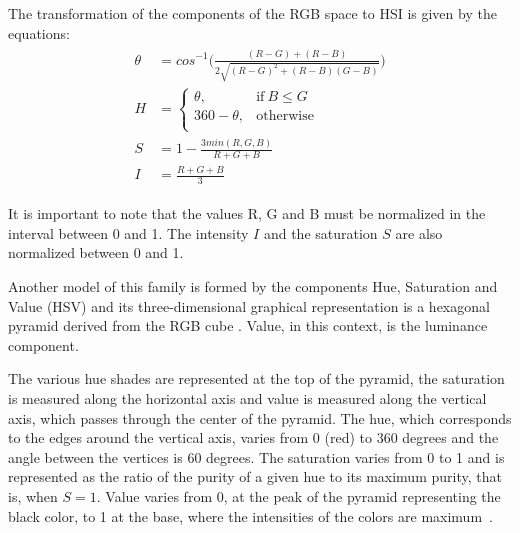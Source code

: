 The transformation of the components of the RGB space to HSI is given by the equations:
\begin{align}
\label{eq:rgb_para_hsi}
\begin{split}
  \theta &= cos^{-1} \bigg( \frac{(R - G) + (R - B)}{2 \sqrt{(R - G)^2 + (R - B)(G - B)}} \bigg)
  \\[0.5em]
  H &= \begin{cases}
            \theta,       & \text{if}\ B \leq G\\
            360 - \theta, & \text{otherwise}\\
       \end{cases}
  \\[0.5em]
  S &= 1 - \frac{3 min(R, G, B)}{R + G + B}
  \\[0.5em]
  I &= \frac{R + G + B}{3}
\end{split}
\end{align}

It is important to note that the values R, G and B must be normalized in the interval between 0 and 1. The intensity $I$ and the saturation $S$ are also normalized between 0 and 1.

Another model of this family is formed by the components Hue, Saturation and Value (HSV) and its three-dimensional graphical representation is a hexagonal pyramid derived from the RGB cube \citep{pedrini:08}. Value, in this context, is the luminance component.

The various hue shades are represented at the top of the pyramid, the saturation is measured along the horizontal axis and value is measured along the vertical axis, which passes through the center of the pyramid. The hue, which corresponds to the edges around the vertical axis, varies from 0 (red) to 360 degrees and the angle between the vertices is 60 degrees. The saturation varies from 0 to 1 and is represented as the ratio of the purity of a given hue to its maximum purity, that is, when $S = 1$. Value varies from 0, at the peak of the pyramid representing the black color, to 1 at the base, where the intensities of the colors are maximum~\citep{pedrini:08}.


